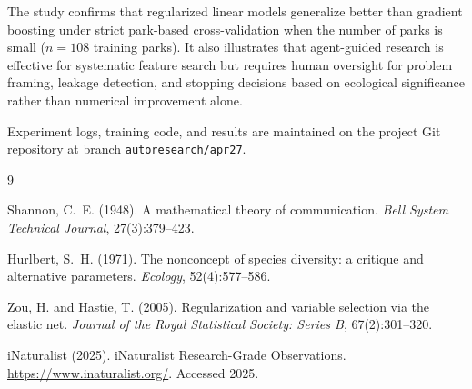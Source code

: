 \documentclass{article}
\begin{document}
The study confirms that regularized linear models generalize better
than gradient boosting under strict park-based cross-validation when
the number of parks is small ($n = 108$ training parks). It also
illustrates that agent-guided research is effective for systematic
feature search but requires human oversight for problem framing,
leakage detection, and stopping decisions based on ecological
significance rather than numerical improvement alone.

Experiment logs, training code, and results are maintained on the
project Git repository at branch \texttt{autoresearch/apr27}.


\begin{thebibliography}{9}

Shannon, C.~E. (1948).
\newblock A mathematical theory of communication.
\newblock \emph{Bell System Technical Journal}, 27(3):379--423.

Hurlbert, S.~H. (1971).
\newblock The nonconcept of species diversity: a critique and alternative
  parameters.
\newblock \emph{Ecology}, 52(4):577--586.

Zou, H. and Hastie, T. (2005).
\newblock Regularization and variable selection via the elastic net.
\newblock \emph{Journal of the Royal Statistical Society: Series B},
  67(2):301--320.

{iNaturalist} (2025).
\newblock iNaturalist Research-Grade Observations.
\newblock \url{https://www.inaturalist.org/}.
\newblock Accessed 2025.

\end{thebibliography}
\end{document}
